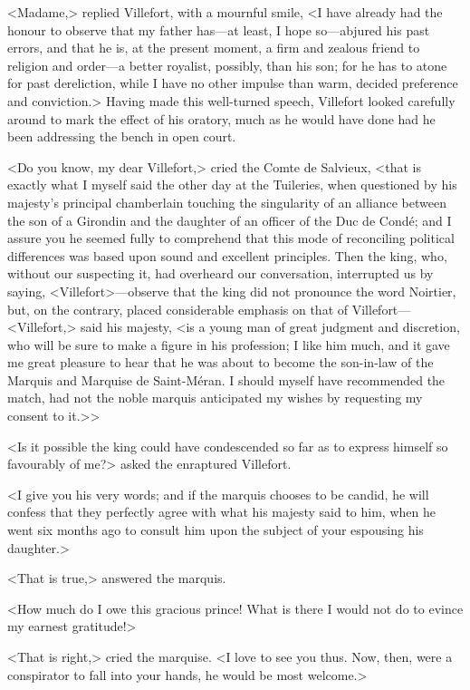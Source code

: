  <Madame,> replied Villefort, with a mournful smile, <I have already had the honour to observe that my father has—at least, I hope so—abjured his past errors, and that he is, at the present moment, a firm and zealous friend to religion and order—a better royalist, possibly, than his son; for he has to atone for past dereliction, while I have no other impulse than warm, decided preference and conviction.> Having made this well-turned speech, Villefort looked carefully around to mark the effect of his oratory, much as he would have done had he been addressing the bench in open court. 

 <Do you know, my dear Villefort,> cried the Comte de Salvieux, <that is exactly what I myself said the other day at the Tuileries, when questioned by his majesty's principal chamberlain touching the singularity of an alliance between the son of a Girondin and the daughter of an officer of the Duc de Condé; and I assure you he seemed fully to comprehend that this mode of reconciling political differences was based upon sound and excellent principles. Then the king, who, without our suspecting it, had overheard our conversation, interrupted us by saying, <Villefort>—observe that the king did not pronounce the word Noirtier, but, on the contrary, placed considerable emphasis on that of Villefort—<Villefort,> said his majesty, <is a young man of great judgment and discretion, who will be sure to make a figure in his profession; I like him much, and it gave me great pleasure to hear that he was about to become the son-in-law of the Marquis and Marquise de Saint-Méran. I should myself have recommended the match, had not the noble marquis anticipated my wishes by requesting my consent to it.>> 

 <Is it possible the king could have condescended so far as to express himself so favourably of me?> asked the enraptured Villefort. 

 <I give you his very words; and if the marquis chooses to be candid, he will confess that they perfectly agree with what his majesty said to him, when he went six months ago to consult him upon the subject of your espousing his daughter.>  
 
 <That is true,> answered the marquis. 

 <How much do I owe this gracious prince! What is there I would not do to evince my earnest gratitude!> 

 <That is right,> cried the marquise. <I love to see you thus. Now, then, were a conspirator to fall into your hands, he would be most welcome.> 

